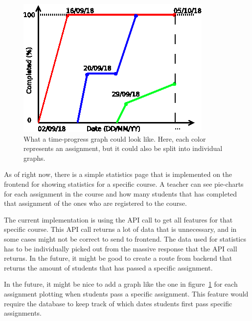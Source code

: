 \begin{figure}
    \centering
    \includegraphics[width=\linewidth]{img_src/progress_over_time.png}
    \caption{What a time-progress graph could look like. Here, each color represents an assignment, but it could also be split into individual graphs.}\label{fig:progovertime}
\end{figure}
As of right now, there is a simple statistics page that is implemented on the frontend for showing statistics for a specific course. A teacher can see pie-charts for each assignment in the course and how many students that has completed that assignment of the ones who are registered to the course.

The current implementation is using the API call to get all features for that specific course. This API call returns a lot of data that is unnecessary, and in some cases might not be correct to send to frontend. The data used for statistics has to be individually picked out from the massive response that the API call returns. In the future, it might be good to create a route from backend that returns the amount of students that has passed a specific assignment.

In the future, it might be nice to add a graph like the one in figure~\ref{fig:progovertime} for each assignment plotting when students pass a specific assignment. This feature would require the database to keep track of which dates students first pass specific assignments.
